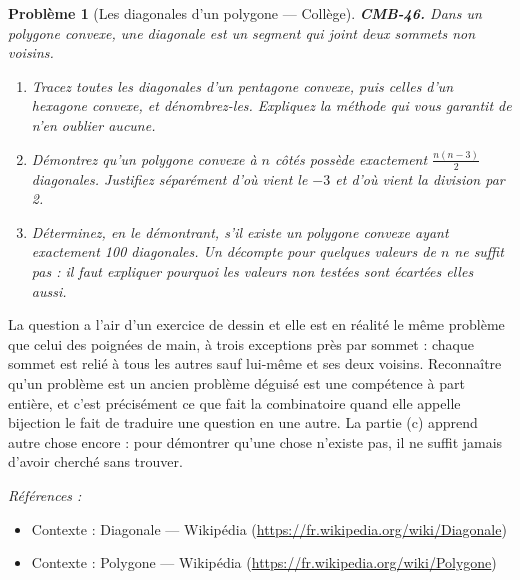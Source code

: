 \documentclass[11pt]{article}
\newtheorem{problem}{Problème}
\newenvironment{refs}{\par\small\noindent\emph{Références :}\begin{itemize}\setlength\itemsep{0pt}}{\end{itemize}\normalsize}
\begin{document}
\begin{problem}[{Les diagonales d'un polygone --- Collège}]
\textbf{CMB-46.} Dans un polygone convexe, une diagonale est un segment qui joint deux sommets
non voisins.
\begin{enumerate}
\item[(a)] Tracez toutes les diagonales d'un pentagone convexe, puis celles d'un hexagone convexe, et
dénombrez-les. Expliquez la méthode qui vous garantit de n'en oublier aucune.
\item[(b)] Démontrez qu'un polygone convexe à $ n $ côtés possède exactement
$ \frac{n(n-3)}{2} $ diagonales. Justifiez séparément d'où vient le $ -3 $ et d'où vient la
division par 2.
\item[(c)] Déterminez, en le démontrant, s'il existe un polygone convexe ayant exactement 100 diagonales.
Un décompte pour quelques valeurs de $ n $ ne suffit pas : il faut expliquer pourquoi les valeurs
non testées sont écartées elles aussi.
\end{enumerate}

\end{problem}

\noindent La question a l'air d'un exercice de dessin et elle est en réalité le même
problème que celui des poignées de main, à trois exceptions près par sommet : chaque sommet est
relié à tous les autres sauf lui-même et ses deux voisins. Reconnaître qu'un problème est un
ancien problème déguisé est une compétence à part entière, et c'est précisément ce que fait la
combinatoire quand elle appelle \og{} bijection \fg{} le fait de traduire une question en une autre. La
partie (c) apprend autre chose encore : pour démontrer qu'une chose n'existe pas, il ne suffit
jamais d'avoir cherché sans trouver.

\begin{refs}
\item Contexte : Diagonale --- Wikipédia (\url{https://fr.wikipedia.org/wiki/Diagonale})
\item Contexte : Polygone --- Wikipédia (\url{https://fr.wikipedia.org/wiki/Polygone})
\end{refs}

\bigskip
\end{document}
